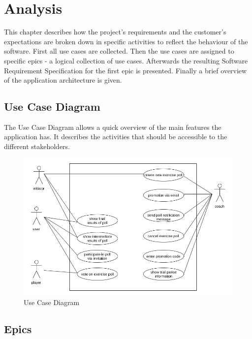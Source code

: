 \section{Analysis}
\label{sec:analysis}

This chapter describes how the project's requirements and the customer's expectations are broken down in specific activities to reflect the behaviour of the software.
First all use cases are collected. Then the use cases are assigned to specific epics - a logical collection of use cases. Afterwards the resulting Software Requirement Specification for the first epic is presented. Finally a brief overview of the application architecture is given.

\subsection{Use Case Diagram}
\label{ssec:use_case_diagram}

The Use Case Diagram allows a quick overview of the main features the application has. It describes the activities that should be accessible to the different stakeholders.

\begin{figure}[H]
    \begin{center}
        \includegraphics[width=\textwidth]{images/ucd.png}
        \caption{Use Case Diagram}
        \label{fig:ucd}
    \end{center}
\end{figure}

\subsection{Epics}
\label{ssec:epics}

